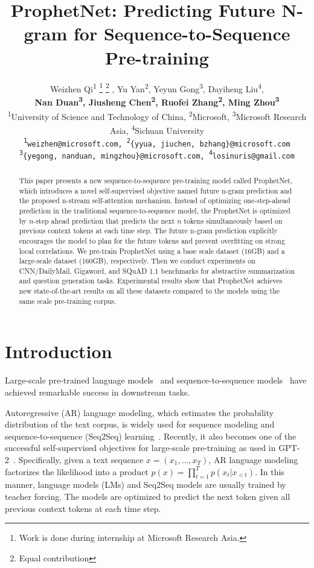 \documentclass[11pt,a4paper]{article}
\title{ProphetNet: Predicting Future N-gram for Sequence-to-Sequence Pre-training}
\author{Weizhen Qi\textsuperscript{1} \thanks{ \hspace{1mm}Work is done during internship at Microsoft Research Asia.}     \thanks{ \hspace{1mm} Equal contribution} , Yu Yan\textsuperscript{2}\footnotemark[2], Yeyun Gong\textsuperscript{3}\footnotemark[2], Dayiheng Liu\textsuperscript{4}\footnotemark[2], \\
\textbf{Nan Duan\textsuperscript{3}, Jiusheng Chen\textsuperscript{2},  Ruofei Zhang\textsuperscript{2}, Ming Zhou\textsuperscript{3}}  \\
  \textsuperscript{1}University of Science and Technology of China, \textsuperscript{2}Microsoft, \textsuperscript{3}Microsoft Research Asia,
  \textsuperscript{4}Sichuan University  \\
  \texttt{\textsuperscript{1}weizhen@microsoft.com, \textsuperscript{2}\{yyua, jiuchen, bzhang\}@microsoft.com} \\  
  \texttt{\textsuperscript{3}\{yegong, nanduan, mingzhou\}@microsoft.com, \textsuperscript{4}losinuris@gmail.com}
  
  }
\date{}
\begin{document}
\maketitle
\begin{abstract}
This paper presents a new sequence-to-sequence pre-training model called ProphetNet, which introduces a novel self-supervised objective named future n-gram prediction and the proposed n-stream self-attention mechanism. Instead of optimizing one-step-ahead prediction in the traditional sequence-to-sequence model, the ProphetNet is optimized by $n$-step ahead prediction that predicts the next $n$ tokens simultaneously based on previous context tokens at each time step. The future n-gram prediction explicitly encourages the model to plan for the future tokens and prevent overfitting on strong local correlations.  We pre-train ProphetNet using a base scale dataset (16GB) and a large-scale dataset (160GB), respectively. Then we conduct experiments on CNN/DailyMail, Gigaword, and SQuAD 1.1 benchmarks for abstractive summarization and question generation tasks. Experimental results show that ProphetNet achieves new state-of-the-art results on all these datasets compared to the models using the same scale pre-training corpus.
\end{abstract}

\section{Introduction}
Large-scale pre-trained language models~\cite{devlin2018bert,radford2019language,yang2019xlnet} and sequence-to-sequence models~\cite{lewis2019bart, song2019mass, raffel2019exploring} have achieved remarkable success in downstream tasks. 

Autoregressive (AR) language modeling, which estimates the probability distribution of the text corpus, is widely used for sequence modeling and sequence-to-sequence (Seq2Seq) learning~\cite{sutskever2014sequence}. 
Recently, it also becomes one of the successful self-supervised objectives for large-scale pre-training as used in GPT-2~\cite{radford2019language}.
Specifically, given a text sequence $x = (x_1, \dots, x_T)$, AR language modeling factorizes the likelihood into a product $p(x) = \prod^{T}_{t=1} p(x_t | x_{<t})$.
In this manner, language models (LMs) and Seq2Seq models are usually trained by teacher forcing. The models are optimized to predict the next token given all previous context tokens at each time step. 
\end{document}
